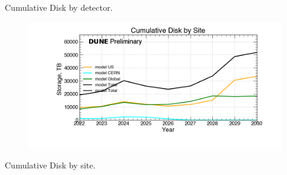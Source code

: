 \begin{table}[h]
\label{tab:DiskByYearByType}
\caption{Cumulative Disk by detector.}
\end{table}
\pagebreak
\begin{figure}[ht]
\centering\includegraphics[height=0.4\textwidth]{Feb24_noMWC_Cumulative-Disk-by-Site-Storage.png}\end{figure}
\begin{table}[h]
\label{tab:DiskByYearByType}
\caption{Cumulative Disk by site.}
\end{table}
\pagebreak
